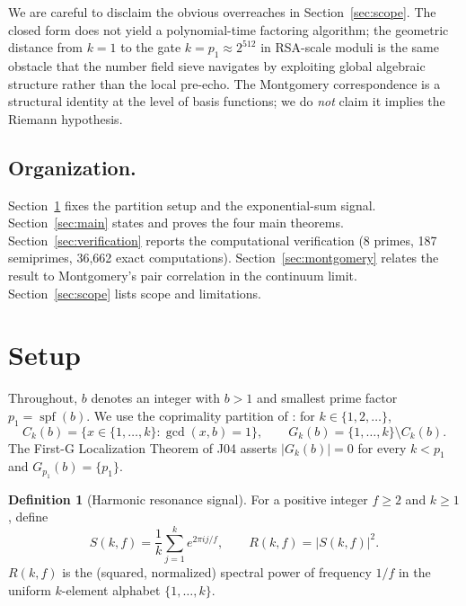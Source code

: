 \documentclass[11pt,reqno]{amsart}
\theoremstyle{plain}
\theoremstyle{definition}
\newtheorem{definition}[theorem]{Definition}
\theoremstyle{remark}
\DeclareMathOperator{\spf}{spf}
\begin{document}
We are careful to disclaim the obvious overreaches in
Section~\ref{sec:scope}. The closed form does not yield a
polynomial-time factoring algorithm; the geometric distance from
$k = 1$ to the gate $k = p_1 \approx 2^{512}$ in RSA-scale
moduli is the same obstacle that the number field sieve
\cite{LenstraEtAl1993} navigates by exploiting global algebraic
structure rather than the local pre-echo. The Montgomery
correspondence is a structural identity at the level of basis
functions; we do \emph{not} claim it implies the Riemann
hypothesis.

\subsection*{Organization.}
Section~\ref{sec:setup} fixes the partition setup and the
exponential-sum signal. Section~\ref{sec:main} states and proves
the four main theorems. Section~\ref{sec:verification} reports
the computational verification (8 primes, 187 semiprimes, 36{,}662
exact computations). Section~\ref{sec:montgomery} relates the
result to Montgomery's pair correlation in the continuum limit.
Section~\ref{sec:scope} lists scope and limitations.

\section{Setup}
\label{sec:setup}

Throughout, $b$ denotes an integer with $b > 1$ and smallest prime
factor $p_1 = \spf(b)$. We use the coprimality partition of
\cite{J04Sanders}: for $k \in \{1, 2, \ldots\}$,
\[
  C_k(b) = \{ x \in \{1, \ldots, k\} : \gcd(x, b) = 1 \},
  \qquad
  G_k(b) = \{1, \ldots, k\} \setminus C_k(b).
\]
The First-G Localization Theorem of J04 \cite[Theorem~3.1]{J04Sanders}
asserts $|G_k(b)| = 0$ for every $k < p_1$ and
$G_{p_1}(b) = \{p_1\}$.

\begin{definition}[Harmonic resonance signal]
\label{def:R}
For a positive integer $f \ge 2$ and $k \ge 1$, define
\begin{equation}
  S(k, f) = \frac{1}{k} \sum_{j=1}^{k} e^{2\pi i j / f},
  \qquad
  R(k, f) = |S(k, f)|^2.
  \label{eq:RSdef}
\end{equation}
$R(k, f)$ is the (squared, normalized) spectral power of frequency
$1/f$ in the uniform $k$-element alphabet $\{1, \ldots, k\}$.
\end{definition}
\end{document}
